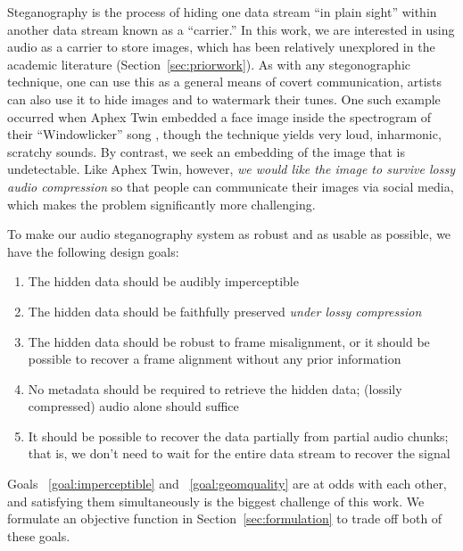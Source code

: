 \documentclass[runningheads]{llncs}
\begin{document}
Steganography is the process of hiding one data stream ``in plain sight'' within another data stream known as a ``carrier.''  In this work, we are interested in using audio as a carrier to store images, which has been relatively unexplored in the academic literature (Section~\ref{sec:priorwork}).  As with any stegonographic technique, one can use this as a general means of covert communication, artists can also use it to hide images and to watermark their tunes.  One such example occurred when Aphex Twin embedded a face image inside the spectrogram of their ``Windowlicker'' song \cite{mathews2004music}, though the technique yields very loud, inharmonic, scratchy sounds.  By contrast, we seek an embedding of the image that is undetectable.  Like Aphex Twin, however, {\em we would like the image to survive lossy audio compression} so that people can communicate their images via social media, which makes the problem significantly more challenging.

To make our audio steganography system as robust and as usable as possible, we have the following design goals:
\begin{enumerate}
    \item \label{goal:imperceptible} The hidden data should be audibly imperceptible
    \item \label{goal:geomquality} The hidden data should be faithfully preserved {\em under lossy compression}
    \item \label{goal:misalignment} The hidden data should be robust to frame misalignment, or it should be possible to recover a frame alignment without any prior information
    \item \label{goal:metadata} No metadata should be required to retrieve the hidden data; (lossily compressed) audio alone should suffice
    \item \label{goal:partial} It should be possible to recover the data partially from partial audio chunks; that is, we don't need to wait for the entire data stream to recover the signal
\end{enumerate}

Goals ~\ref{goal:imperceptible} and ~\ref{goal:geomquality} are at odds with each other, and satisfying them simultaneously is the biggest challenge of this work.  We formulate an objective function in Section~\ref{sec:formulation} to trade off both of these goals.
\end{document}
